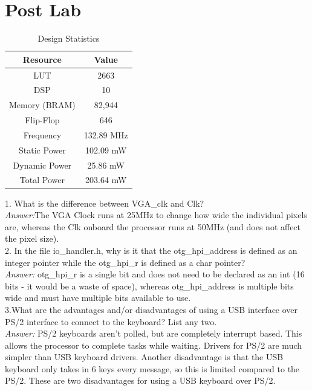 \documentclass[journal, twocolumn, final,11pt,letterpaper]{IEEEtran}
\begin{document}
\section{Post Lab}
\begin{table}[htbp]
	\centering
	\begin{tabular}{c|c}	%
		\toprule	%
		Resource & Value \\
		\midrule
		LUT & 2663\\
		DSP & 10\\
		Memory (BRAM) & 82,944\\
		Flip-Flop & 646\\
		Frequency &   132.89 MHz\\
		Static Power & 102.09 mW\\
		Dynamic Power &  25.86 mW\\
		Total Power & 203.64 mW\\
		\bottomrule	%
	\end{tabular}%
	\caption{Design Statistics}
	\label{tab:design}
\end{table}

1. What is the difference between VGA\_clk and Clk? \\

\textit{Answer:}The VGA Clock runs at 25MHz to change how wide the individual pixels are, whereas the Clk onboard the processor runs at 50MHz (and does not affect the pixel size).\\

2. In the file io\_handler.h, why is it that the otg\_hpi\_address is defined as an integer pointer while the otg\_hpi\_r is defined as a char pointer? \\

\textit{Answer:} otg\_hpi\_r is a single bit and does not need to be declared as an int (16 bits - it would be a waste of space), whereas otg\_hpi\_address is multiple bits wide and must have multiple bits available to use.\\

3.What are the advantages and/or disadvantages of using a USB interface over PS/2 interface to connect to the keyboard? List any two. \\

\textit{Answer:} PS/2 keyboards aren't polled, but are completely interrupt based. This allows the processor to complete tasks while waiting. Drivers for PS/2 are much simpler than USB keyboard drivers. Another disadvantage is that the USB keyboard only takes in 6 keys every message, so this is limited compared to the PS/2. These are two disadvantages for using a USB keyboard over PS/2.\\
\end{document}
